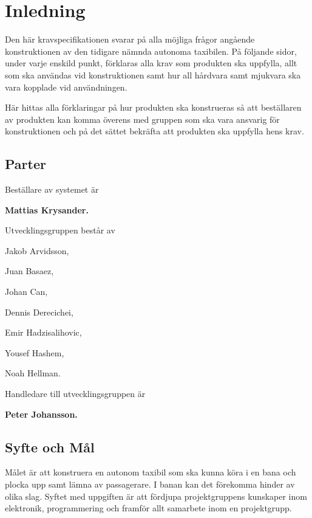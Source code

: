 \documentclass[kravspec/krav.tex]{subfiles}
\begin{document}
\section{Inledning}
Den här kravspecifikationen svarar på alla möjliga frågor angående
konstruktionen av den tidigare nämnda autonoma taxibilen. På följande sidor,
under varje enskild punkt, förklaras alla krav som produkten ska uppfylla,
allt som ska användas vid konstruktionen samt hur all hårdvara samt mjukvara
ska vara kopplade vid användningen.

Här hittas alla förklaringar på  hur produkten ska konstrueras så att
beställaren av produkten kan komma överens med gruppen som ska vara
ansvarig för konstruktionen och på det sättet bekräfta att produkten ska
uppfylla hens krav.

\subsection{Parter}
Beställare av systemet är
\begin{list}{}
    \item \bfseries Mattias Krysander.
\end{list}\vspace{4mm}

\noindent
Utvecklingsgruppen består av
{\bfseries\begin{list}{}
   \item Jakob Arvidsson,
   \item Juan Basaez,
   \item Johan Can,
   \item Dennis Derecichei,
   \item Emir Hadzisalihovic,
   \item Yousef Hashem,
   \item Noah Hellman.
\end{list}}\vspace{4mm}

\noindent
Handledare till utvecklingsgruppen är
\begin{list}{}	
	\item \bfseries Peter Johansson.
\end{list}\vspace{4mm}

\subsection{Syfte och Mål}
Målet är att konstruera en autonom taxibil som ska kunna köra i en bana och
plocka upp samt lämna av passagerare. I banan kan det förekomma hinder av olika
slag. Syftet med uppgiften är att fördjupa projektgruppens kunskaper inom
elektronik, programmering och framför allt samarbete inom en projektgrupp.
\end{document}
